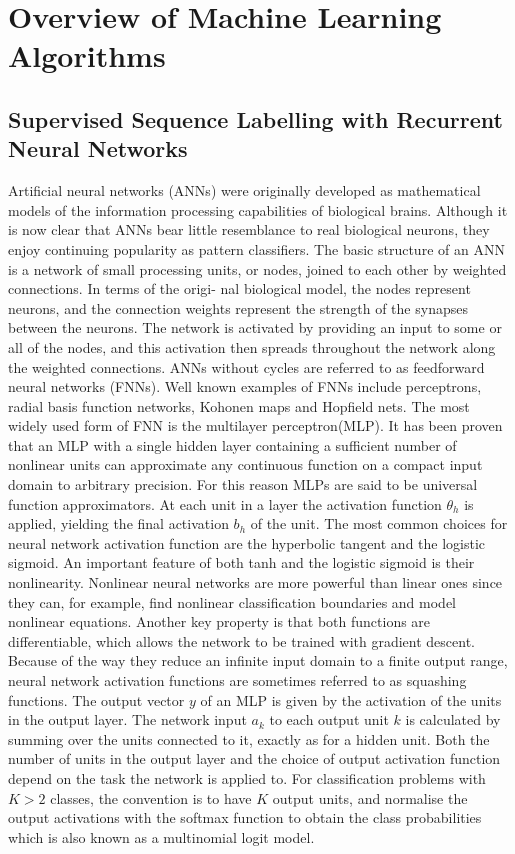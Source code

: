 \section{Overview of Machine Learning Algorithms}
\subsection{Supervised Sequence Labelling with Recurrent Neural Networks}
Artificial neural networks (ANNs) were originally developed as mathematical models of the information processing capabilities of biological brains. Although it is now clear that ANNs bear little resemblance to real biological neurons, they enjoy continuing popularity as pattern classifiers. The basic structure of an ANN is a network of small processing units, or nodes, joined to each other by weighted connections. In terms of the origi- nal biological model, the nodes represent neurons, and the connection weights represent the strength of the synapses between the neurons. The network is activated by providing an input to some or all of the nodes, and this activation then spreads throughout the network along the weighted connections. ANNs without cycles are referred to as feedforward neural networks (FNNs). Well known examples of FNNs include perceptrons, radial basis function networks, Kohonen maps and Hopfield nets. The most widely used form of FNN is the multilayer perceptron(MLP). It has been proven that an MLP with a single hidden layer containing a sufficient number of nonlinear units can approximate any continuous function on a compact input domain to arbitrary precision. For this reason MLPs are said to be universal function approximators.
At each unit in a layer the activation function $\theta_h$ is applied, yielding the final activation $b_h$ of the unit. The most common choices for neural network activation function are the hyperbolic tangent and the logistic sigmoid. An important feature of both tanh and the logistic sigmoid is their nonlinearity. Nonlinear neural networks are more powerful than linear ones since they can, for example, find nonlinear classification boundaries and model nonlinear equations. Another key property is that both functions are differentiable, which allows the network to be trained with gradient descent. Because of the way they reduce an infinite input domain to a finite output range, neural network activation functions are sometimes referred to as squashing functions. The output vector $y$ of an MLP is given by the activation of the units in the output layer. The network input $a_k$ to each output unit $k$ is calculated by summing over the units connected to it, exactly as for a hidden unit. Both the number of units in the output layer and the choice of output activation function depend on the task the network is applied to. For classification problems with $K > 2$ classes, the convention is to have $K$ output units, and normalise the output activations with the softmax function to obtain the class probabilities which is also known as a multinomial logit model.

